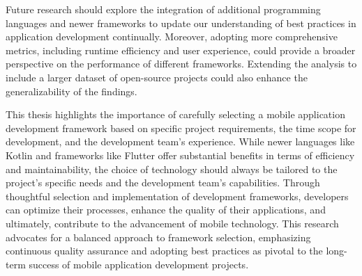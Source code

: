 \par
Future research should explore the integration of additional programming languages and newer frameworks to update our understanding of best practices in application development continually. Moreover, adopting more comprehensive metrics, including runtime efficiency and user experience, could provide a broader perspective on the performance of different frameworks. Extending the analysis to include a larger dataset of open-source projects could also enhance the generalizability of the findings.
\par
This thesis highlights the importance of carefully selecting a mobile application development framework based on specific project requirements, the time scope for development, and the development team’s experience. While newer languages like Kotlin and frameworks like Flutter offer substantial benefits in terms of efficiency and maintainability, the choice of technology should always be tailored to the project's specific needs and the development team's capabilities. Through thoughtful selection and implementation of development frameworks, developers can optimize their processes, enhance the quality of their applications, and ultimately, contribute to the advancement of mobile technology. This research advocates for a balanced approach to framework selection, emphasizing continuous quality assurance and adopting best practices as pivotal to the long-term success of mobile application development projects.
